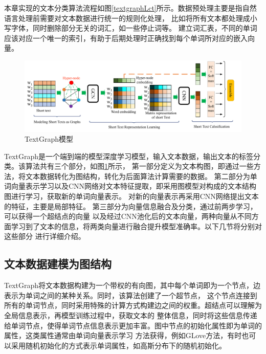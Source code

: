 本章实现的文本分类算法流程如图\ref{textgraphLct}所示。数据预处理主要是指自然语言处理前需要对文本数据进行统一的规则化处理，
比如将所有文本都处理成小写字体，同时删除部分无关的词汇，如一些停止词等。
建立词汇表，不同的单词应该对应一个唯一的索引，有助于后期处理时正确找到每个单词所对应的嵌入向量。
\begin{figure}[htb]%
	\setlength{\belowcaptionskip}{0pt}
	\centering
	\includegraphics[width=1\textwidth]{pic/TextGraph-arch.pdf}
	\caption{TextGraph模型}
	\label{textGraph}
\end{figure}

TextGraph是一个端到端的模型深度学习模型，输入文本数据，输出文本的标签分类。该算法共有三个部分，如图\ref{textGraph}所示，
第一部分定义为文本构图，即通过一些方法，将文本数据转化为图结构，转化为后面算法计算需要的数据。
第二部分为单词向量表示学习以及CNN网络对文本特征提取，即采用图模型对构成的文本结构图进行学习，获取新的单词向量表示。
对新的向量表示再采用CNN网络提出文本的特征，主要是局部特征。
第三部分为向量信息融合及分类，通过前两步学习，可以获得一个超结点的向量
以及经过CNN池化后的文本向量，两种向量从不同方面学习到了文本的信息，将两类向量进行融合提升模型准确率。以下几节将分别对这些部分
进行详细介绍。
\subsection{文本数据建模为图结构}
TextGraph将文本数据构建为一个带权的有向图，其中每个单词即为一个节点，边表示为单词之间的某种关系。同时，该算法创建了一个超节点，
这个节点连接到所有的单词节点，同时采用特殊的计算方式构建边之间的权重。超结点可以理解为全局信息表示，再模型训练过程中，获取文本的
整体信息，同时将这些信息传递给单词节点，使得单词节点信息表示更加丰富。图中节点的初始化属性即为单词的属性，这类属性通常由单词向量表示学习
方法获得，例如GLove方法，有时也可以采用随机初始化的方式表示单词属性，如高斯分布下的随机初始化。

